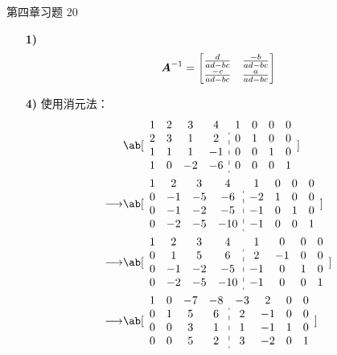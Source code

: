 \begin{problem}
	第四章习题 20

	\begin{solution}
		\begin{enumerate}
			\item[\textbf{1)}]
			$$
			\boldsymbol{A}^{-1} = \begin{bmatrix}
				\frac{d}{ad - bc} & \frac{-b}{ad - bc} \\
				\frac{-c}{ad - bc} & \frac{a}{ad - bc}
			\end{bmatrix}
			$$
			
			\item[\textbf{4)}] 使用消元法：
			$$
			\begin{aligned}
				& \ab[\begin{array}{cccc:cccc}
					1 & 2 & 3 & 4 & 1 & 0 & 0 & 0 \\
					2 & 3 & 1 & 2 & 0 & 1 & 0 & 0 \\
					1 & 1 & 1 & -1 & 0 & 0 & 1 & 0 \\
					1 & 0 & -2 & -6 & 0 & 0 & 0 & 1
				\end{array}] \\
				\longrightarrow & \ab[\begin{array}{cccc:cccc}
					1 & 2 & 3 & 4 & 1 & 0 & 0 & 0 \\
					0 & -1 & -5 & -6 & -2 & 1 & 0 & 0 \\
					0 & -1 & -2 & -5 & -1 & 0 & 1 & 0 \\
					0 & -2 & -5 & -10 & -1 & 0 & 0 & 1
				\end{array}] \\
				\longrightarrow & \ab[\begin{array}{cccc:cccc}
					1 & 2 & 3 & 4 & 1 & 0 & 0 & 0 \\
					0 & 1 & 5 & 6 & 2 & -1 & 0 & 0 \\
					0 & -1 & -2 & -5 & -1 & 0 & 1 & 0 \\
					0 & -2 & -5 & -10 & -1 & 0 & 0 & 1
				\end{array}] \\
				\longrightarrow & \ab[\begin{array}{cccc:cccc}
					1 & 0 & -7 & -8 & -3 & 2 & 0 & 0 \\
					0 & 1 & 5 & 6 & 2 & -1 & 0 & 0 \\
					0 & 0 & 3 & 1 & 1 & -1 & 1 & 0 \\
					0 & 0 & 5 & 2 & 3 & -2 & 0 & 1
				\end{array}] \\

\end{aligned}$$
\end{enumerate}
\end{solution}
\end{problem}

